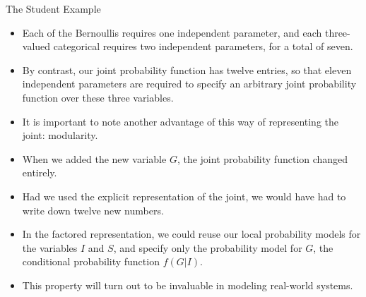 \documentclass[handout]{beamer}
\begin{document}
\begin{frame}{The Student Example}
\scriptsize{
\begin{itemize}
	\item Each of the Bernoullis requires one independent parameter, and each three-valued categorical requires two independent parameters, for a total of seven. 
	\item By contrast, our joint probability function  has twelve entries, so that eleven independent parameters are required to specify an arbitrary joint probability function over these three variables.
\item It is important to note another advantage of this way of representing the joint: modularity.
\item When we added the new variable $G$, the joint probability function changed entirely. 
\item Had we used the explicit representation of the joint, we would have had to write down twelve new numbers. 
\item In the factored representation, we could reuse our local probability models for the variables $I$ and $S$, and specify only the probability model for $G$, the conditional probability function  $f(G | I)$. 
\item This property will turn out to be invaluable in modeling real-world systems.
	

\end{itemize}



} 

\end{frame}
\end{document}
